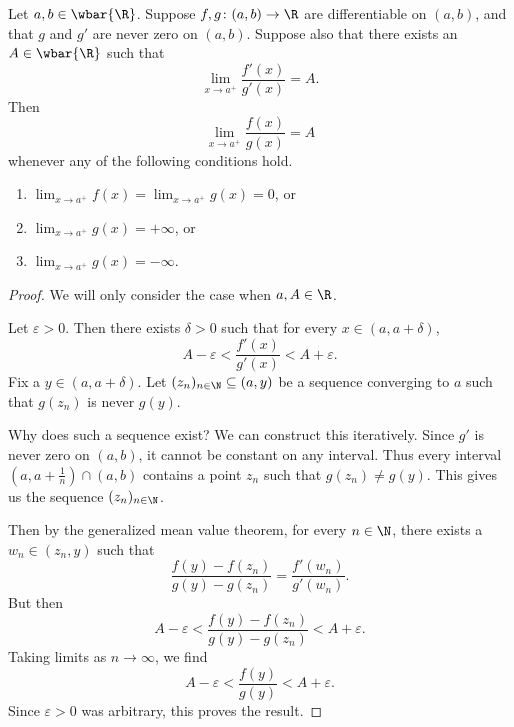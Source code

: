 \begin{theorem} \label{thm:lhopital}
    Let $a, b \in \wbar{\R}$.
    Suppose $f, g\colon (a, b) \to \R$ are differentiable on $(a, b)$,
    and that $g$ and $g'$ are never zero on $(a, b)$.
    Suppose also that there exists an $A \in \wbar{\R}$ such that \[
        \lim_{x \to a^+} \frac{f'(x)}{g'(x)} = A.
    \] Then \[
        \lim_{x \to a^+} \frac{f(x)}{g(x)} = A
    \] whenever any of the following conditions hold.
    \begin{enumerate}
        \item $\lim_{x \to a^+} f(x) = \lim_{x \to a^+} g(x) = 0$, or
        \item $\lim_{x \to a^+} g(x) = +\infty$, or
        \item $\lim_{x \to a^+} g(x) = -\infty$.
    \end{enumerate}
\end{theorem}
\begin{proof}
    We will only consider the case when $a, A \in \R$.

    Let $\varepsilon > 0$.
    Then there exists $\delta > 0$ such that
    for every $x \in (a, a + \delta)$, \[
        A - \varepsilon < \frac{f'(x)}{g'(x)} < A + \varepsilon.
    \] Fix a $y \in (a, a + \delta)$.
    Let $(z_n)_{n \in \N} \subseteq (a, y)$ be a sequence converging to
    $a$ such that $g(z_n)$ is never $g(y)$.

    Why does such a sequence exist?
    We can construct this iteratively.
    Since $g'$ is never zero on $(a, b)$,
    it cannot be constant on any interval.
    Thus every interval $(a, a+\frac1n) \cap (a, b)$ contains a point $z_n$
    such that $g(z_n) \ne g(y)$.
    This gives us the sequence $(z_n)_{n \in \N}$.

    Then by the generalized mean value theorem, for every $n \in \N$,
    there exists a $w_n \in (z_n, y)$ such that \[
        \frac{f(y) - f(z_n)}{g(y) - g(z_n)} = \frac{f'(w_n)}{g'(w_n)}.
    \] But then \[
        A - \varepsilon
            < \frac{f(y) - f(z_n)}{g(y) - g(z_n)}
                < A + \varepsilon.
    \] Taking limits as $n \to \infty$, we find \[
        A - \varepsilon < \frac{f(y)}{g(y)} < A + \varepsilon.
    \] Since $\varepsilon > 0$ was arbitrary, this proves the result.
\end{proof}
